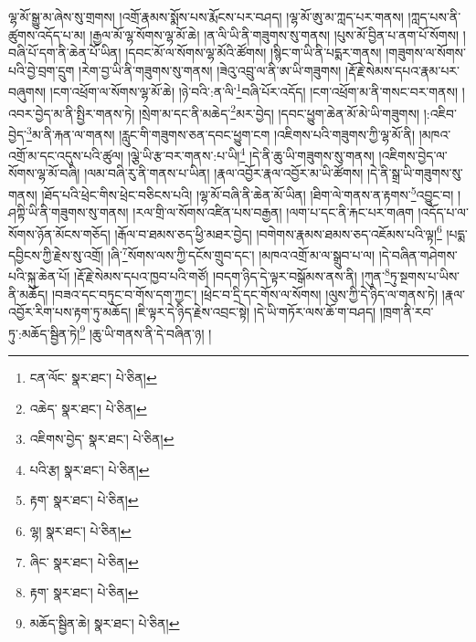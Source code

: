 ལྷ་མོ་སྒྱུ་མ་ཞེས་སུ་གྲགས། །འགྲོ་རྣམས་སྨོས་པས་རྨོངས་པར་བཤད། །ལྷ་མོ་ཨུ་མ་ཀླད་པར་གནས། །ཀླད་པས་ནི་ཚུགས་འདོད་པ་མ། །རྒྱལ་མོ་ལྷ་སོགས་ལྷ་མོ་ཆེ། །ན་ལི་ཡི་ནི་གཟུགས་སུ་གནས། །པུས་མོ་བྱིན་པ་ནག་པོ་སོགས། །བཞི་པོ་དག་ནི་ཆེན་པོ་ཡིན། །དབང་མོ་ལ་སོགས་ལྷ་མོའི་ཚོགས། །སྙིང་ག་ཡི་ནི་པདྨར་གནས། །གཟུགས་ལ་སོགས་པའི་བྱེ་བྲག་དྲུག །རེག་བྱ་ཡི་ནི་གཟུགས་སུ་གནས། །ཟེའུ་འབྲུ་ལ་ནི་ཨ་ཡི་གཟུགས། །རྡོ་རྗེ་སེམས་དཔའ་རྣམ་པར་བཞུགས། །ངག་འཕྲོག་ལ་སོགས་ལྷ་མོ་ཆེ། །ཉེ་བའི་:ན་ལི་\footnote{ངན་ལོང་  སྣར་ཐང་།  པེ་ཅིན། }བཞི་པོར་འདོད། །ངག་འཕྲོག་མ་ནི་གསང་བར་གནས། །འབར་བྱེད་མ་ནི་སྤྱིར་གནས་ཏེ། །སྲེག་མ་དང་ནི་མཆེད་\footnote{འཆེད་  སྣར་ཐང་།  པེ་ཅིན། }མར་བྱེད། །དབང་ཕྱུག་ཆེན་མོ་མེ་ཡི་གཟུགས། །:འཇིབ་བྱེད་\footnote{འཇིགས་བྱེད་  སྣར་ཐང་།  པེ་ཅིན། }མ་ནི་རྐན་ལ་གནས། །རླུང་གི་གཟུགས་ཅན་དབང་ཕྱུག་ངག །འཇིགས་པའི་གཟུགས་ཀྱི་ལྷ་མོ་ནི། །མཁའ་འགྲོ་མ་དང་འདུས་པའི་ཚུལ། །ལྕེ་ཡི་རྩ་བར་གནས་:པ་ཡི།\footnote{པའི་རྩ།  སྣར་ཐང་།  པེ་ཅིན། } །དེ་ནི་ཆུ་ཡི་གཟུགས་སུ་གནས། །འཇིགས་བྱེད་ལ་སོགས་ལྷ་མོ་བཞི། །ལམ་བཞི་རུ་ནི་གནས་པ་ཡིན། །རྣལ་འབྱོར་རྣལ་འབྱོར་མ་ཡི་ཚོགས། །དེ་ནི་སྒྲ་ཡི་གཟུགས་སུ་གནས། །ཐོད་པའི་ཕྲེང་གིས་ཕྲེང་བཅིངས་པའི། །ལྷ་མོ་བཞི་ནི་ཆེན་མོ་ཡིན། །ཐིག་ལེ་གནས་ན་རྟགས་\footnote{རྟག་  སྣར་ཐང་།  པེ་ཅིན། }འབྱུང་བ། །ཤཀྟི་ཡི་ནི་གཟུགས་སུ་གནས། །རལ་གྲི་ལ་སོགས་འཛིན་པས་བརྒྱན། །ལག་པ་དང་ནི་རྐང་པར་གཞག །འདོད་པ་ལ་སོགས་ཉོན་མོངས་གཅོད། །རྒོལ་བ་ཐམས་ཅད་ཕྱི་མཐར་བྱེད། །བགེགས་རྣམས་ཐམས་ཅད་འཇོམས་པའི་ལྟ།\footnote{ལྷ།  སྣར་ཐང་།  པེ་ཅིན། } །པདྨ་དབྱིངས་ཀྱི་རྗེས་སུ་འགྲོ། །ཞི་\footnote{ཞིང་  སྣར་ཐང་།  པེ་ཅིན། }སོགས་ལས་ཀྱི་དངོས་གྲུབ་དང་། །མཁའ་འགྲོ་མ་ལ་སྒྲུབ་པ་ལ། །དེ་བཞིན་གཤེགས་པའི་སྐུ་ཆེན་པོ། །རྡོ་རྗེ་སེམས་དཔའ་ཁྱབ་པའི་གཙོ། །བདག་ཉིད་དེ་ལྟར་བསྒོམས་ནས་ནི། །ཀུན་\footnote{རྟག་  སྣར་ཐང་།  པེ་ཅིན། }ཏུ་སྔགས་པ་ཡིས་ནི་མཆོད། །བཟའ་དང་བཏུང་བ་གོས་དག་ཀྱང་། །ཕྲེང་བ་དྲི་དང་གོས་ལ་སོགས། །ལུས་ཀྱི་དེ་ཉིད་ལ་གནས་ཏེ། །རྣལ་འབྱོར་རིག་པས་རྟག་ཏུ་མཆོད། །ཇི་ལྟར་དེ་ཉིད་རྗེས་འབྲང་སྟེ། །དེ་ཡི་གཏོར་ལས་ཆོ་ག་བཤད། །ཁྲག་ནི་རབ་ཏུ་:མཆོད་སྦྱིན་ཏེ།\footnote{མཆོད་སྦྱིན་ཆེ།  སྣར་ཐང་།  པེ་ཅིན། } །ཆུ་ཡི་གནས་ནི་དེ་བཞིན་ཉ། །
